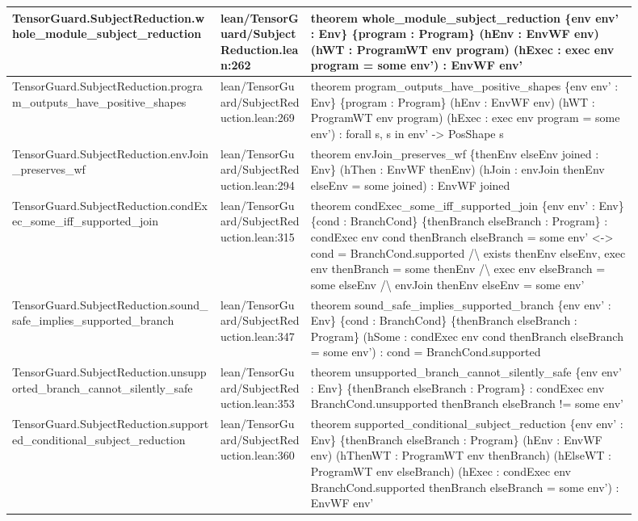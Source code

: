 \documentclass[10pt]{article}
\begin{document}
\begin{longtable}{|p{0.30\linewidth}|p{0.13\linewidth}|p{0.47\linewidth}|}
\hline
TensorGuard.SubjectReduction.whole\_module\_subject\_reduction & lean/TensorGuard/SubjectReduction.lean:262 & theorem whole\_module\_subject\_reduction \{env env' : Env\} \{program : Program\} (hEnv : EnvWF env) (hWT : ProgramWT env program) (hExec : exec env program = some env') : EnvWF env' \\
\hline
TensorGuard.SubjectReduction.program\_outputs\_have\_positive\_shapes & lean/TensorGuard/SubjectReduction.lean:269 & theorem program\_outputs\_have\_positive\_shapes \{env env' : Env\} \{program : Program\} (hEnv : EnvWF env) (hWT : ProgramWT env program) (hExec : exec env program = some env') : forall s, s in env' -> PosShape s \\
\hline
TensorGuard.SubjectReduction.envJoin\_preserves\_wf & lean/TensorGuard/SubjectReduction.lean:294 & theorem envJoin\_preserves\_wf \{thenEnv elseEnv joined : Env\} (hThen : EnvWF thenEnv) (hJoin : envJoin thenEnv elseEnv = some joined) : EnvWF joined \\
\hline
TensorGuard.SubjectReduction.condExec\_some\_iff\_supported\_join & lean/TensorGuard/SubjectReduction.lean:315 & theorem condExec\_some\_iff\_supported\_join \{env env' : Env\} \{cond : BranchCond\} \{thenBranch elseBranch : Program\} : condExec env cond thenBranch elseBranch = some env' <-> cond = BranchCond.supported /\textbackslash{} exists thenEnv elseEnv, exec env thenBranch = some thenEnv /\textbackslash{} exec env elseBranch = some elseEnv /\textbackslash{} envJoin thenEnv elseEnv = some env' \\
\hline
TensorGuard.SubjectReduction.sound\_safe\_implies\_supported\_branch & lean/TensorGuard/SubjectReduction.lean:347 & theorem sound\_safe\_implies\_supported\_branch \{env env' : Env\} \{cond : BranchCond\} \{thenBranch elseBranch : Program\} (hSome : condExec env cond thenBranch elseBranch = some env') : cond = BranchCond.supported \\
\hline
TensorGuard.SubjectReduction.unsupported\_branch\_cannot\_silently\_safe & lean/TensorGuard/SubjectReduction.lean:353 & theorem unsupported\_branch\_cannot\_silently\_safe \{env env' : Env\} \{thenBranch elseBranch : Program\} : condExec env BranchCond.unsupported thenBranch elseBranch != some env' \\
\hline
TensorGuard.SubjectReduction.supported\_conditional\_subject\_reduction & lean/TensorGuard/SubjectReduction.lean:360 & theorem supported\_conditional\_subject\_reduction \{env env' : Env\} \{thenBranch elseBranch : Program\} (hEnv : EnvWF env) (hThenWT : ProgramWT env thenBranch) (hElseWT : ProgramWT env elseBranch) (hExec : condExec env BranchCond.supported thenBranch elseBranch = some env') : EnvWF env' \\

\end{longtable}
\end{document}
